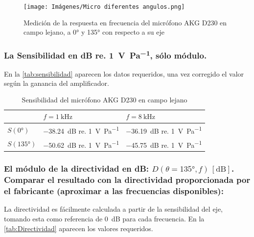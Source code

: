\documentclass[10pt]{article}
\begin{document}
\begin{figure}[hbtp]
  \centering
  \texttt{[image: Imágenes/Micro diferentes angulos.png]}
  \caption{Medición de la respuesta en frecuencia del micrófono AKG D230 en campo lejano, a \ang{0} y \ang{135} con respecto a su eje}
  \label{fig:grados}
\end{figure}

\subsubsection{La Sensibilidad en dB re. \qty{1}{\volt\per\pascal}, sólo módulo.}

En la \autoref{tab:sensibilidad} aparecen los datos requeridos, una vez corregido el valor según la ganancia del amplificador.

\begin{table}[htbp]
  \centering
  \caption{Sensibilidad del micrófono AKG D230 en campo lejano}
  \begin{tabular}{|l|r|r|}
    \cline{2-3}    \multicolumn{1}{r}{} & \multicolumn{1}{|l|}{$f = \qty{1}{\kilo \hertz }$} & \multicolumn{1}{l|}{$f = \qty{8}{\kilo \hertz }$} \bigstrut    \\
    \hline
    $S (\ang{0})$                       & \qty{-38.24}{\dB} re. \qty{1}{\volt \per \pascal } & \qty{-36.19}{\dB} re. \qty{1}{\volt \per \pascal }   \bigstrut \\
    \hline
    $S (\ang{135})$                     & \qty{-50.62}{\dB} re. \qty{1}{\volt \per \pascal } & \qty{-45.75}{\dB} re. \qty{1}{\volt \per \pascal }   \bigstrut \\
    \hline
  \end{tabular}%
  \label{tab:sensibilidad}%
\end{table}%



\subsubsection{El módulo de la directividad en dB: $D(\theta = \ang{135}, f) \, [\unit{\dB}]$. Comparar el resultado con la directividad proporcionada por el fabricante (aproximar a las frecuencias disponibles):}

La directividad es fácilmente calculada a partir de la sensibilidad del eje, tomando esta como referencia de \qty{0}{\dB} para cada frecuencia. En la \autoref{tab:Directividad} aparecen los valores requeridos.
\end{document}
